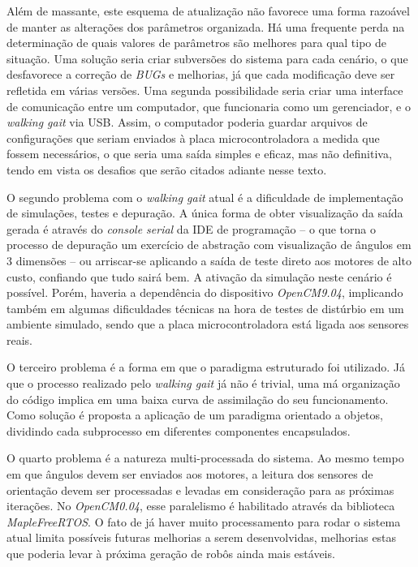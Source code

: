 Além de massante, este esquema de atualização não favorece uma forma razoável de manter as alterações dos parâmetros organizada. Há uma frequente perda na determinação de quais valores de parâmetros são melhores para qual tipo de situação. Uma solução seria criar subversões do sistema para cada cenário, o que desfavorece a correção de \textit{BUGs} e melhorias, já que cada modificação deve ser refletida em várias versões. Uma segunda possibilidade seria criar uma interface de comunicação entre um computador, que funcionaria como um gerenciador, e o \textit{walking gait} via USB. Assim, o computador poderia guardar arquivos de configurações que seriam enviados à placa microcontroladora a medida que fossem necessários, o que seria uma saída simples e eficaz, mas não definitiva, tendo em vista os desafios que serão citados adiante nesse texto.

O segundo problema com o \textit{walking gait} atual é a dificuldade de implementação de simulações, testes e depuração. A única forma de obter visualização da saída gerada é através do \textit{console serial} da IDE de programação -- o que torna o processo de depuração um exercício de abstração com visualização de ângulos em 3 dimensões -- ou arriscar-se aplicando a saída de teste direto aos motores de alto custo, confiando que tudo sairá bem. A ativação da simulação neste cenário é possível. Porém, haveria a dependência do dispositivo \textit{OpenCM9.04}, implicando também em algumas dificuldades técnicas na hora de testes de distúrbio em um ambiente simulado, sendo que a placa microcontroladora está ligada aos sensores reais.

O terceiro problema é a forma em que o paradigma estruturado foi utilizado. Já que o processo realizado pelo \textit{walking gait} já não é trivial, uma má organização do código implica em uma baixa curva de assimilação do seu funcionamento. Como solução é proposta a aplicação de um paradigma orientado a objetos, dividindo cada subprocesso em diferentes componentes encapsulados.

O quarto problema é a natureza multi-processada do sistema. Ao mesmo tempo em que ângulos devem ser enviados aos motores, a leitura dos sensores de orientação devem ser processadas e levadas em consideração para as próximas iterações. No \textit{OpenCM0.04}, esse paralelismo é habilitado através da biblioteca \textit{MapleFreeRTOS}. O fato de já haver muito processamento para rodar o sistema atual limita possíveis futuras melhorias a serem desenvolvidas, melhorias estas que poderia levar à próxima geração de robôs ainda mais estáveis.

